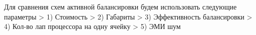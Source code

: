 Для сравнения схем активной балансировки будем использовать следующие параметры
> 1) Стоимость
> 2) Габариты
> 3) Эффективность балансировки
> 4) Кол-во лап процессора на одну ячейку 
> 5) ЭМИ шум


